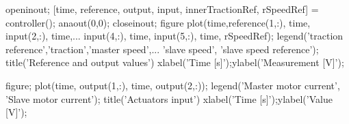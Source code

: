 \clearpage
\begin{matlabcode}
openinout;
[time, reference, output, input, innerTractionRef, rSpeedRef] = controller();
anaout(0,0);
closeinout;
figure %
plot(time,reference(1,:), time, input(2,:), time,...
  input(4,:), time, input(5,:), time, rSpeedRef); %
legend('traction reference','traction','master speed',...
  'slave speed', 'slave speed reference');
title('Reference and output values')
xlabel('Time [s]');ylabel('Measurement [V]');

figure;
plot(time, output(1,:), time, output(2,:));
legend('Master motor current', 'Slave motor current');
title('Actuators input')
xlabel('Time [s]');ylabel('Value [V]');
\end{matlabcode}
